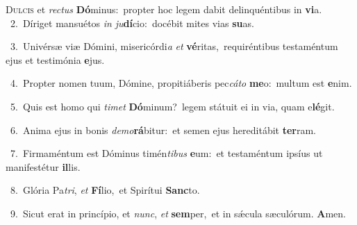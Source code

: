 \lettrine{\initial\textcolor{\initialcolor}{D}}{ulcis} et \textit{rec}\-\textit{tus} \textbf{Dó}\-minus:~\star propter hoc legem dabit delinquéntibus in \textbf{vi}\-a.\\
{\numbfont\textcolor{\numbcolor}{~2.}}~Díriget mansuétos \textit{in} \textit{ju}\-\textbf{dí}cio:~\star docébit mites vias \textbf{su}\-as.\par
{\numbfont\textcolor{\numbcolor}{~3.}}~Univérsæ viæ Dómini, misericórdi\textit{a} \textit{et} \textbf{vé}\-ritas,~\star requiréntibus testaméntum ejus et testimónia \textbf{e}\-jus.\par
{\numbfont\textcolor{\numbcolor}{~4.}}~Propter nomen tuum, Dómine, propitiáberis pec\-\textit{cá}\-\textit{to} \textbf{me}\-o:~\star multum est \textbf{e}\-nim.\par
{\numbfont\textcolor{\numbcolor}{~5.}}~Quis est homo qui \textit{ti}\-\textit{met} \textbf{Dó}\-minum?~\star legem státuit ei in via, quam e\-\textbf{lé}\-git.\par
{\numbfont\textcolor{\numbcolor}{~6.}}~Anima ejus in bonis \textit{de}\-\textit{mo}\textbf{rá}bitur:~\star et semen ejus hereditábit \textbf{ter}\-ram.\par
{\numbfont\textcolor{\numbcolor}{~7.}}~Firmaméntum est Dóminus timén\-\textit{ti}\-\textit{bus} \textbf{e}\-um:~\star et testaméntum ipsíus ut manifestétur \textbf{il}\-lis.\par
{\numbfont\textcolor{\numbcolor}{~8.}}~Glória Pa\-\textit{tri}\-, \textit{et} \textbf{Fí}\-lio,~\star et Spirítui \textbf{Sanc}\-to.\par
{\numbfont\textcolor{\numbcolor}{~9.}}~Sicut erat in princípio, et \textit{nunc}\-, \textit{et} \textbf{sem}\-per,~\star et in sǽcula sæculórum. \textbf{A}\-men.\par
